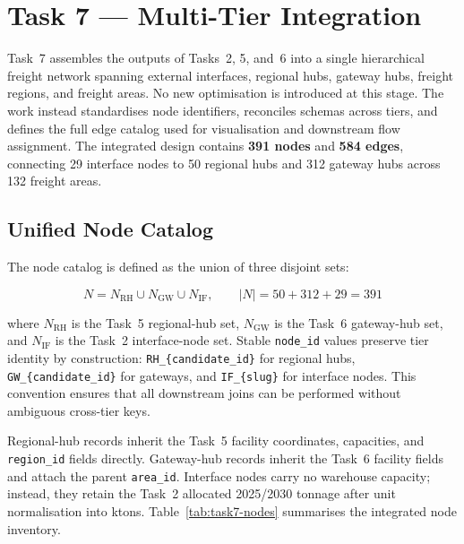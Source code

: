 
\section{Task 7 --- Multi-Tier Integration}

Task~7 assembles the outputs of Tasks~2, 5, and~6 into a single hierarchical freight
network spanning external interfaces, regional hubs, gateway hubs, freight regions, and
freight areas. No new optimisation is introduced at this stage. The work instead
standardises node identifiers, reconciles schemas across tiers, and defines the full edge
catalog used for visualisation and downstream flow assignment. The integrated design
contains \textbf{391 nodes} and \textbf{584 edges}, connecting 29 interface nodes to
50 regional hubs and 312 gateway hubs across 132 freight areas.

\subsection{Unified Node Catalog}

The node catalog is defined as the union of three disjoint sets:

\begin{equation}
  N = N_{\text{RH}} \cup N_{\text{GW}} \cup N_{\text{IF}},
  \qquad
  |N| = 50 + 312 + 29 = 391
  \label{eq:task7-nodes}
\end{equation}

where $N_{\text{RH}}$ is the Task~5 regional-hub set, $N_{\text{GW}}$ is the Task~6
gateway-hub set, and $N_{\text{IF}}$ is the Task~2 interface-node set. Stable
\texttt{node\_id} values preserve tier identity by construction:
\texttt{RH\_\{candidate\_id\}} for regional hubs, \texttt{GW\_\{candidate\_id\}} for
gateways, and \texttt{IF\_\{slug\}} for interface nodes. This convention ensures that
all downstream joins can be performed without ambiguous cross-tier keys.

Regional-hub records inherit the Task~5 facility coordinates, capacities, and
\texttt{region\_id} fields directly. Gateway-hub records inherit the Task~6 facility
fields and attach the parent \texttt{area\_id}. Interface nodes carry no warehouse
capacity; instead, they retain the Task~2 allocated 2025/2030 tonnage after unit
normalisation into ktons. Table~\ref{tab:task7-nodes} summarises the integrated node
inventory.

